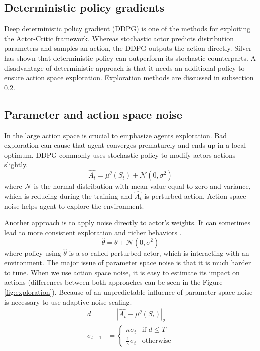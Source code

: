 \subsection{Deterministic policy gradients}
Deep deterministic policy gradient (DDPG) is one of the methods for exploiting the Actor-Critic framework. Whereas stochastic actor predicts distribution parameters and samples an action, the DDPG outputs the action directly. Silver \cite{silver2014} has shown that deterministic policy can outperform its stochastic counterparts. A disadvantage of deterministic approach is that it needs an additional policy to ensure action space exploration. Exploration methods are discussed in subsection \ref{sec:exploration}.

\subsection{Parameter and action space noise}
\label{sec:exploration}
In the large action space is crucial to emphasize agents exploration. Bad exploration can cause that agent converges prematurely and ends up in a local optimum. DDPG commonly uses stochastic policy to modify actors actions slightly.
\begin{equation} \label{eq:exploration}
\hat{A_t} = \mu^\theta(S_t) + \mathcal{N}(0, \sigma^2)
\end{equation}
where $\mathcal{N}$ is the normal distribution with mean value equal to zero and variance, which is reducing during the training and $\hat{A_t}$ is perturbed action. Action space noise helps agent to explore the environment. \par Another approach is to apply noise directly to actor's weights. It can sometimes lead to more consistent exploration and richer behaviors \cite{plappert2017}.
\begin{equation}
\hat{\theta} = \theta + \mathcal{N}(0, \sigma^2)
\end{equation}
where policy using $\hat{\theta}$ is a so-called perturbed actor, which is interacting with an environment. The major issue of parameter space noise is that it is much harder to tune. When we use action space noise, it is easy to estimate its impact on actions (differences between both approaches can be seen in the Figure \ref{fig:exploration}). Because of an unpredictable influence of parameter space noise is necessary to use adaptive noise scaling.
\begin{align}
d &= |\hat{A_t} - \mu^\theta(S_t)|_2  \\
\sigma_{t+1} &= 
     \begin{cases}
       \kappa \sigma_t & \text{if } d \leq T \\
       \frac{1}{\kappa}\sigma_t & \text{otherwise}
     \end{cases}
\end{align}
